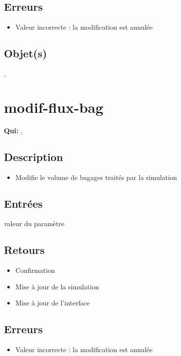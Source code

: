 	\subsection{Erreurs}
	\begin{itemize}
		\item Valeur incorrecte : la modification est annulée \warning
	\end{itemize}

	\subsection{Objet(s)}
		\circobjs, \event

\section{modif-flux-bag}
	\textbf{Qui:} \urt, \us

	\subsection{Description}
	\begin{itemize}
		\item Modifie le volume de bagages traités par la simulation
	\end{itemize}

	\subsection{Entrées}
		valeur du paramètre

	\subsection{Retours}
	\begin{itemize}
		\item Confirmation
		\item Mise à jour de la simulation
		\item Mise à jour de l'interface
	\end{itemize}

	\subsection{Erreurs}
	\begin{itemize}
		\item Valeur incorrecte : la modification est annulée \warning
	\end{itemize}

